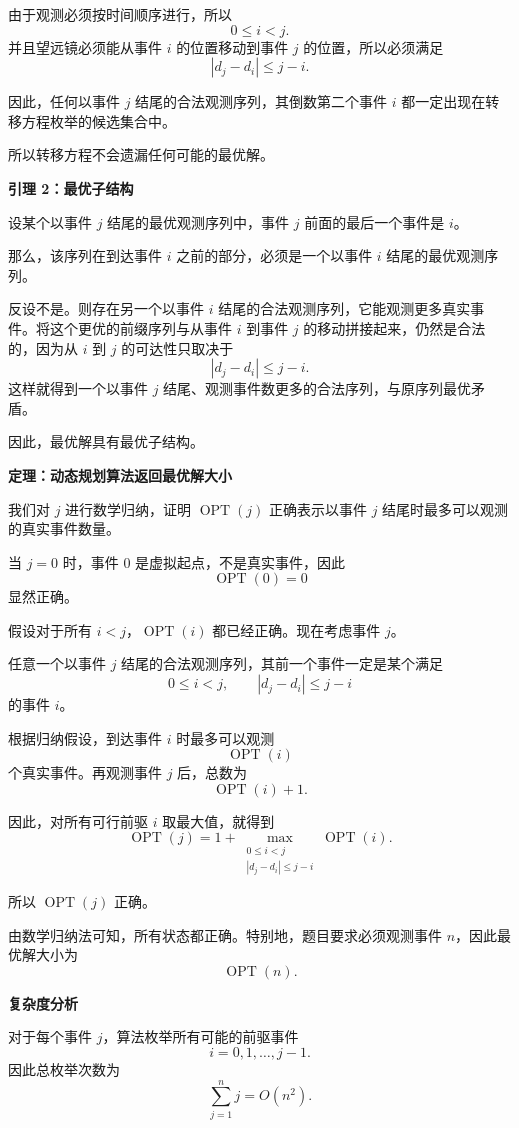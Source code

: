 \documentclass[12pt,a4paper]{article}
\begin{document}
\begin{answerbox}
由于观测必须按时间顺序进行，所以
\[
0\le i<j.
\]
并且望远镜必须能从事件 $i$ 的位置移动到事件 $j$ 的位置，所以必须满足
\[
|d_j-d_i|\le j-i.
\]

因此，任何以事件 $j$ 结尾的合法观测序列，其倒数第二个事件 $i$ 都一定出现在转移方程枚举的候选集合中。

所以转移方程不会遗漏任何可能的最优解。

\textbf{引理 2：最优子结构}

设某个以事件 $j$ 结尾的最优观测序列中，事件 $j$ 前面的最后一个事件是 $i$。

那么，该序列在到达事件 $i$ 之前的部分，必须是一个以事件 $i$ 结尾的最优观测序列。

反设不是。则存在另一个以事件 $i$ 结尾的合法观测序列，它能观测更多真实事件。将这个更优的前缀序列与从事件 $i$ 到事件 $j$ 的移动拼接起来，仍然是合法的，因为从 $i$ 到 $j$ 的可达性只取决于
\[
|d_j-d_i|\le j-i.
\]
这样就得到一个以事件 $j$ 结尾、观测事件数更多的合法序列，与原序列最优矛盾。

因此，最优解具有最优子结构。

\textbf{定理：动态规划算法返回最优解大小}

我们对 $j$ 进行数学归纳，证明 $\operatorname{OPT}(j)$ 正确表示以事件 $j$ 结尾时最多可以观测的真实事件数量。

当 $j=0$ 时，事件 $0$ 是虚拟起点，不是真实事件，因此
\[
\operatorname{OPT}(0)=0
\]
显然正确。

假设对于所有 $i<j$，$\operatorname{OPT}(i)$ 都已经正确。现在考虑事件 $j$。

任意一个以事件 $j$ 结尾的合法观测序列，其前一个事件一定是某个满足
\[
0\le i<j,
\qquad
|d_j-d_i|\le j-i
\]
的事件 $i$。

根据归纳假设，到达事件 $i$ 时最多可以观测
\[
\operatorname{OPT}(i)
\]
个真实事件。再观测事件 $j$ 后，总数为
\[
\operatorname{OPT}(i)+1.
\]

因此，对所有可行前驱 $i$ 取最大值，就得到
\[
\operatorname{OPT}(j)
=
1+
\max_{\substack{0\le i<j\\ |d_j-d_i|\le j-i}}
\operatorname{OPT}(i).
\]

所以 $\operatorname{OPT}(j)$ 正确。

由数学归纳法可知，所有状态都正确。特别地，题目要求必须观测事件 $n$，因此最优解大小为
\[
\operatorname{OPT}(n).
\]

\textbf{复杂度分析}

对于每个事件 $j$，算法枚举所有可能的前驱事件
\[
i=0,1,\ldots,j-1.
\]
因此总枚举次数为
\[
\sum_{j=1}^{n} j = O(n^2).
\]


\end{answerbox}
\end{document}
